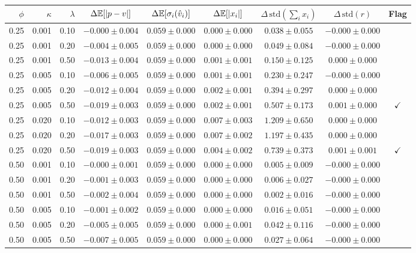 \begin{tabular}{rrrcccccc}
\hline
$\phi$ & $\kappa$ & $\lambda$ & $\Delta\mathbb{E}[|p-v|]$ & $\Delta\mathbb{E}[\sigma_i(\hat v_i)]$ & $\Delta\mathbb{E}[|x_i|]$ & $\Delta\,\mathrm{std}(\sum_i x_i)$ & $\Delta\,\mathrm{std}(r)$ & Flag \\
\hline
0.25 & 0.001 & 0.10 & $-0.000\pm0.004$ & $0.059\pm0.000$ & $0.000\pm0.000$ & $0.038\pm0.055$ & $-0.000\pm0.000$ &  \\
0.25 & 0.001 & 0.20 & $-0.004\pm0.005$ & $0.059\pm0.000$ & $0.000\pm0.000$ & $0.049\pm0.084$ & $-0.000\pm0.000$ &  \\
0.25 & 0.001 & 0.50 & $-0.013\pm0.004$ & $0.059\pm0.000$ & $0.001\pm0.001$ & $0.150\pm0.125$ & $0.000\pm0.000$ &  \\
0.25 & 0.005 & 0.10 & $-0.006\pm0.005$ & $0.059\pm0.000$ & $0.001\pm0.001$ & $0.230\pm0.247$ & $-0.000\pm0.000$ &  \\
0.25 & 0.005 & 0.20 & $-0.012\pm0.004$ & $0.059\pm0.000$ & $0.002\pm0.001$ & $0.394\pm0.297$ & $0.000\pm0.000$ &  \\
0.25 & 0.005 & 0.50 & $-0.019\pm0.003$ & $0.059\pm0.000$ & $0.002\pm0.001$ & $0.507\pm0.173$ & $0.001\pm0.000$ & $\checkmark$ \\
0.25 & 0.020 & 0.10 & $-0.012\pm0.003$ & $0.059\pm0.000$ & $0.007\pm0.003$ & $1.209\pm0.650$ & $0.000\pm0.000$ &  \\
0.25 & 0.020 & 0.20 & $-0.017\pm0.003$ & $0.059\pm0.000$ & $0.007\pm0.002$ & $1.197\pm0.435$ & $0.000\pm0.000$ &  \\
0.25 & 0.020 & 0.50 & $-0.019\pm0.003$ & $0.059\pm0.000$ & $0.004\pm0.002$ & $0.739\pm0.373$ & $0.001\pm0.001$ & $\checkmark$ \\
0.50 & 0.001 & 0.10 & $-0.000\pm0.001$ & $0.059\pm0.000$ & $0.000\pm0.000$ & $0.005\pm0.009$ & $-0.000\pm0.000$ &  \\
0.50 & 0.001 & 0.20 & $-0.001\pm0.003$ & $0.059\pm0.000$ & $0.000\pm0.000$ & $0.006\pm0.027$ & $-0.000\pm0.000$ &  \\
0.50 & 0.001 & 0.50 & $-0.002\pm0.004$ & $0.059\pm0.000$ & $0.000\pm0.000$ & $0.002\pm0.016$ & $-0.000\pm0.000$ &  \\
0.50 & 0.005 & 0.10 & $-0.001\pm0.002$ & $0.059\pm0.000$ & $0.000\pm0.000$ & $0.016\pm0.051$ & $-0.000\pm0.000$ &  \\
0.50 & 0.005 & 0.20 & $-0.005\pm0.005$ & $0.059\pm0.000$ & $0.000\pm0.001$ & $0.042\pm0.116$ & $-0.000\pm0.000$ &  \\
0.50 & 0.005 & 0.50 & $-0.007\pm0.005$ & $0.059\pm0.000$ & $0.000\pm0.000$ & $0.027\pm0.064$ & $-0.000\pm0.000$ &  \\

\end{tabular}
